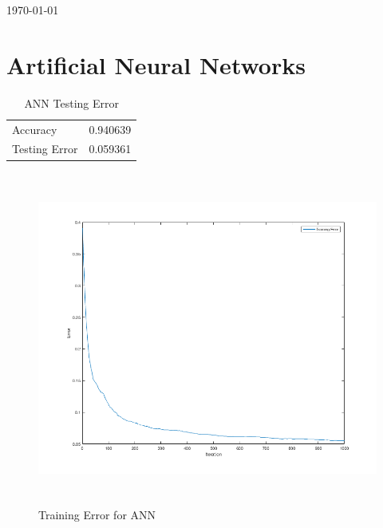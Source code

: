 \documentclass[12pt]{article}
\begin{document}
\begin{titlepage}

{\large \today}\\[3cm] %




\vfill %
\end{titlepage}

\newpage

\section{Artificial Neural Networks}
\begin{table}[h]
\begin{center}
\begin{tabular}{|l|l|}
\hline
Accuracy & 0.940639\\
Testing Error & 0.059361\\
\hline
\end{tabular}
\caption{ANN Testing Error}
\end{center}
\end{table}


\begin{figure}[H]
\begin{center}
\includegraphics[height=11cm]{problem1_training_error.png}
\caption{Training Error for ANN}
\end{center}
\end{figure}
\end{document}
